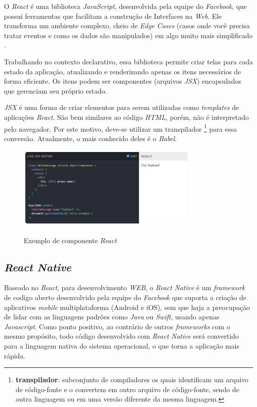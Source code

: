 O \textit{React} é uma biblioteca \textit{JavaScript}, desenvolvida pela equipe do \textit{Facebook}, que possui ferramentas que facilitam a construção de Interfaces na \textit{Web}. Ele transforma um ambiente complexo, cheio de \textit{Edge Cases} (casos onde você precisa tratar eventos e como os dados são manipulados) em algo muito mais simplificado \cite{React}.

Trabalhando no contexto declarativo, essa biblioteca permite criar telas para cada estado da aplicação, atualizando e renderizando apenas os itens necessários de forma eficiente. Os itens podem ser componentes (arquivos \textit{JSX}) encapsulados que gerenciam seu próprio estado.

\textit{JSX} é uma forma de criar elementos para serem utilizadas como \textit{templates} de aplicações \textit{React}. São bem similares ao código \textit{HTML}, porém, não é interpretado pelo navegador. Por este motivo, deve-se utilizar um transpilador \footnote{\textbf{transpilador}: subconjunto de compiladores os quais identificam um arquivo de código-fonte e o convertem em outro arquivo de código-fonte, sendo de outra linguagem ou em uma versão diferente da mesma linguagem.} para essa conversão. Atualmente, o mais conhecido deles é o \textit{Babel}.

\begin{figure}[H]
	\centering
	\caption{Exemplo de componente \textit{React}}
	\includegraphics[width=0.8\textwidth]{figuras/exemplo_react.jpg}
	\label{fig:react_code}
\end{figure} 


\subsection{\textit{React Native}}

Baseado no \textit{React}, para desenvolvimento \textit{WEB}, o \textit{React Native} é um \textit{framework} de codigo aberto desenvolvido pela equipe do \textit{Facebook} que suporta a criação de aplicativos \textit{mobile} multiplataforma (Android e iOS), sem que haja a preocupação de lidar com as linguagens padrões como \textit{Java} ou \textit{Swift}, usando apenas \textit{Javascript}. Como ponto positivo, ao contrário de outros \textit{frameworks} com o mesmo propósito, todo código desenvolvido com \textit{React Native} será convertido para a linguagem nativa do sistema operacional, o que torna a aplicação mais rápida.

